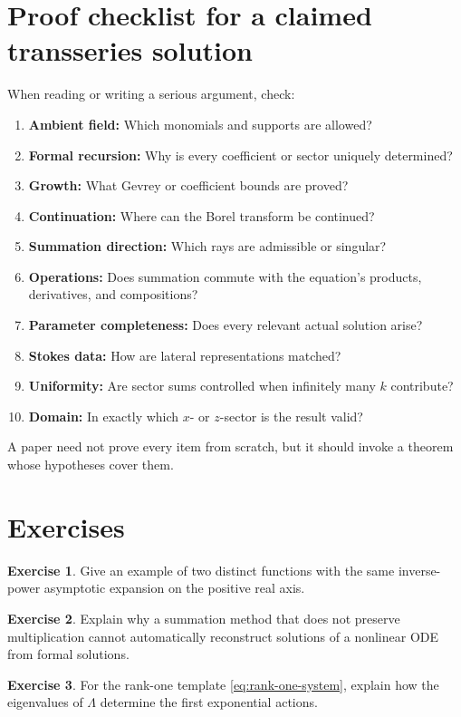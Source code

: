 \documentclass[11pt,openany]{book}
\theoremstyle{definition}
\newtheorem{exercise}{Exercise}[chapter]
\theoremstyle{plain}
\theoremstyle{remark}
\begin{document}
\section{Proof checklist for a claimed transseries solution}

When reading or writing a serious argument, check:
\begin{enumerate}
 \item \textbf{Ambient field:} Which monomials and supports are allowed?
 \item \textbf{Formal recursion:} Why is every coefficient or sector uniquely determined?
 \item \textbf{Growth:} What Gevrey or coefficient bounds are proved?
 \item \textbf{Continuation:} Where can the Borel transform be continued?
 \item \textbf{Summation direction:} Which rays are admissible or singular?
 \item \textbf{Operations:} Does summation commute with the equation's products, derivatives, and compositions?
 \item \textbf{Parameter completeness:} Does every relevant actual solution arise?
 \item \textbf{Stokes data:} How are lateral representations matched?
 \item \textbf{Uniformity:} Are sector sums controlled when infinitely many $k$ contribute?
 \item \textbf{Domain:} In exactly which $x$- or $z$-sector is the result valid?
\end{enumerate}
A paper need not prove every item from scratch, but it should invoke a theorem whose hypotheses cover them.

\section{Exercises}

\begin{exercise}
Give an example of two distinct functions with the same inverse-power asymptotic expansion on the positive real axis.
\end{exercise}

\begin{exercise}
Explain why a summation method that does not preserve multiplication cannot automatically reconstruct solutions of a nonlinear ODE from formal solutions.
\end{exercise}

\begin{exercise}
For the rank-one template \eqref{eq:rank-one-system}, explain how the eigenvalues of $\Lambda$ determine the first exponential actions.
\end{exercise}
\end{document}
